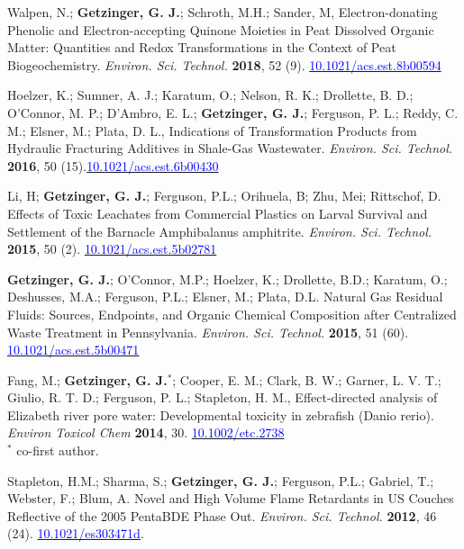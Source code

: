 \documentclass[letterpaper,10pt]{article}
\begin{document}
\begin{etaremune}
%
\item Walpen, N.; {\bfseries Getzinger, G. J.}; Schroth, M.H.; Sander, M, Electron-donating Phenolic and Electron-accepting Quinone Moieties in Peat Dissolved Organic Matter: Quantities and Redox Transformations in the Context of Peat Biogeochemistry. \emph{Environ. Sci. Technol.} {\bfseries 2018}, 52 (9). \href{http://dx.doi.org/10.1021/acs.est.8b00594}{\textcolor{blue}{10.1021/acs.est.8b00594}}
%
\item Hoelzer, K.; Sumner, A. J.; Karatum, O.; Nelson, R. K.; Drollette, B. D.; O'Connor, M. P.; D'Ambro, E. L.; {\bfseries Getzinger, G. J.}; Ferguson, P. L.; Reddy, C. M.; Elsner, M.; Plata, D. L., Indications of Transformation Products from Hydraulic Fracturing Additives in Shale-Gas Wastewater. \emph{Environ. Sci. Technol.} {\bfseries 2016}, 50 (15).\href{http://dx.doi.org/10.1021/acs.est.6b00430}{\textcolor{blue}{10.1021/acs.est.6b00430}}
%
\item Li, H; { \bfseries Getzinger, G. J.}; Ferguson, P.L.; Orihuela, B; Zhu, Mei; Rittschof, D. Effects of Toxic Leachates from Commercial Plastics on Larval Survival 
  and Settlement of the Barnacle Amphibalanus amphitrite. \emph{Environ. Sci. Technol.} {\bfseries 2015}, 50 (2). \href{http://dx.doi.org/10.1021/acs.est.5b02781}{\textcolor{blue}{10.1021/acs.est.5b02781}}
\item { \bfseries Getzinger, G. J.}; O'Connor, M.P.; Hoelzer, K.; Drollette, B.D.; Karatum, O.; Deshusses, M.A.; Ferguson, P.L.; Elsner, M.; Plata, D.L. Natural Gas Residual Fluids: Sources, Endpoints, and Organic Chemical Composition after Centralized Waste Treatment in Pennsylvania. \emph{Environ. Sci. Technol.} {\bfseries 2015}, 51 (60). \href{http://dx.doi.org/10.1021/acs.est.5b00471}{\textcolor{blue}{10.1021/acs.est.5b00471}}
%
\item Fang, M.; { \bfseries Getzinger, G. J.}$^*$; Cooper, E. M.; Clark, B. W.; Garner, L. V. T.; Giulio, R. T. D.; Ferguson, P. L.; Stapleton, H. M., Effect-directed analysis of Elizabeth river pore water: Developmental toxicity in zebrafish (Danio rerio). \emph{Environ Toxicol Chem} {\bfseries 2014}, 30. \href{http://dx.doi.org/10.1002/etc.2738}{\textcolor{blue}{ 10.1002/etc.2738}} \\ $^*$ co-first author. 
%
\item Stapleton, H.M.; Sharma, S.; {\bfseries Getzinger, G. J.}; Ferguson, P.L.; Gabriel, T.; Webster, F.; Blum, A. Novel and High Volume Flame Retardants in US Couches Reflective of the 2005 PentaBDE Phase Out. \emph{Environ. Sci. Technol.} {\bfseries 2012}, 46 (24). \href{http://dx.doi.org/10.1021/es303471d}{\textcolor{blue}{10.1021/es303471d}}.
\end{etaremune}
%
\end{document}
